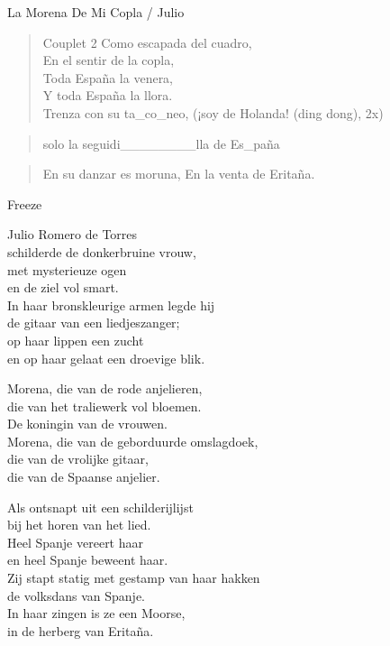\begin{song}{La Morena De Mi Copla / Julio}

\begin{verse}{Couplet 2}
Como escapada del cuadro,\\
En el sentir de la copla,\\
Toda España la venera,\chord{}\\
Y toda España la llora.\\
Trenza con su ta\_co\_neo, (¡soy de Holanda! \small{(ding dong)}, 2x)
\end{verse}

\begin{verse}{solo}
la seguidi\_\_\_\_\_\_\_\_lla de Es\_paña
\end{verse}

\begin{verse}{}
En su danzar es moruna,\hspace{4em}
En la venta de Eritaña.

\end{verse}
\begin{center}
\large{Freeze}
\end{center}
\end{song}

\begin{translation}
Julio Romero de Torres\\
schilderde de donkerbruine vrouw,\\
met mysterieuze ogen\\
en de ziel vol smart.\\
In haar bronskleurige armen legde hij\\
de gitaar van een liedjeszanger;\\
op haar lippen een zucht\\
en op haar gelaat een droevige blik.\vspace{\wlskip}

Morena, die van de rode anjelieren,\\
die van het traliewerk vol bloemen.\\
De koningin van de vrouwen.\\
Morena, die van de geborduurde omslagdoek,\\
die van de vrolijke gitaar,\\
die van de Spaanse anjelier.\vspace{\wlskip}

Als ontsnapt uit een schilderijlijst\\
bij het horen van het lied.\\
Heel Spanje vereert haar\\
en heel Spanje beweent haar.\\
Zij stapt statig met gestamp van haar hakken\\
de volksdans van Spanje.\\
In haar zingen is ze een Moorse,\\
in de herberg van Eritaña.
\end{translation}
